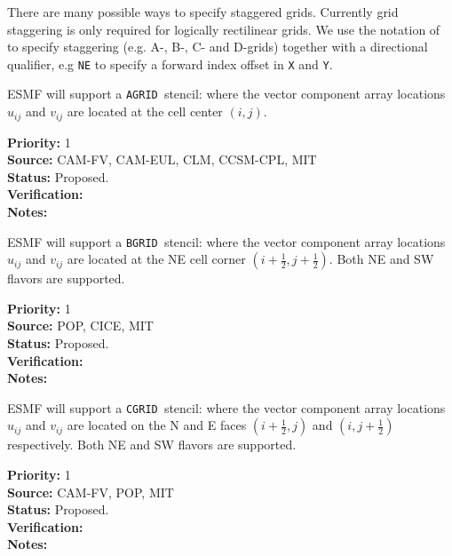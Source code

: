 
There are many possible ways to specify staggered grids.  Currently
grid staggering is only required for logically rectilinear grids. We
use the notation of \cite{ref:a1966} to specify staggering (e.g. A-,
B-, C- and D-grids) together with a directional qualifier, e.g
\texttt{NE} to specify a forward index offset in \texttt{X} and
\texttt{Y}.

\newcommand{\agrid}{\texttt{AGRID~}}
\newcommand{\bgrid}{\texttt{BGRID~}}
\newcommand{\cgrid}{\texttt{CGRID~}}
\newcommand{\dgrid}{\texttt{DGRID~}}

\sreq{\agrid}

ESMF will support a \agrid stencil: where the vector
component array locations $u_{ij}$ and $v_{ij}$ are located at the
cell center $(i,j)$.

\begin{reqlist}
{\bf Priority:} 1\\ 
{\bf Source:} CAM-FV, CAM-EUL, CLM, CCSM-CPL, MIT \\
{\bf Status:} Proposed. \\
{\bf Verification:} \\
{\bf Notes:}
\end{reqlist}

\sreq{\bgrid}

ESMF will support a \bgrid stencil: where the vector component array
locations $u_{ij}$ and $v_{ij}$ are located at the NE cell corner
$(i+\frac12,j+\frac12)$. Both NE and SW flavors are supported.

\begin{reqlist}
{\bf Priority:} 1\\ 
{\bf Source:} POP, CICE, MIT \\
{\bf Status:} Proposed. \\
{\bf Verification:} \\
{\bf Notes:}
\end{reqlist}

\sreq{\cgrid}

ESMF will support a \cgrid stencil: where the vector component array
locations $u_{ij}$ and $v_{ij}$ are located on the N and E faces
$(i+\frac12,j)$ and $(i,j+\frac12)$ respectively. Both NE and SW
flavors are supported.

\begin{reqlist}
{\bf Priority:} 1 \\ 
{\bf Source:} CAM-FV, POP, MIT \\
{\bf Status:} Proposed. \\
{\bf Verification:} \\
{\bf Notes:}
\end{reqlist}

